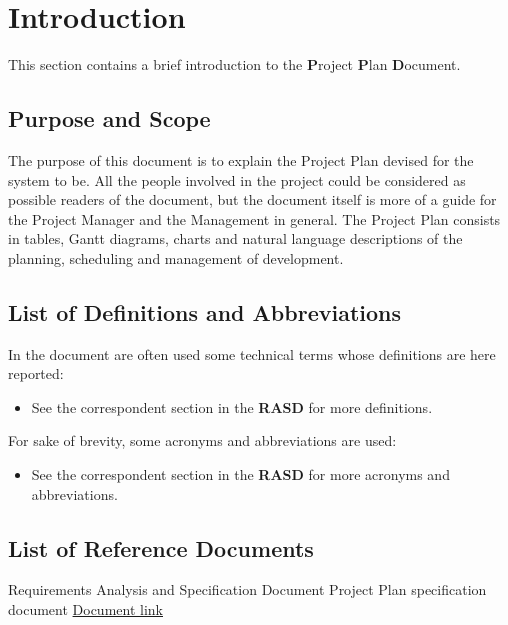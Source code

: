 \section{Introduction}
This section contains a brief introduction to the \textbf{P}roject \textbf{P}lan \textbf{D}ocument.
%
\subsection{Purpose and Scope}
The purpose of this document is to explain the Project Plan devised for the system to be.
All the people involved in the project could be considered as possible readers of the document, but the document itself is more of a guide for the Project Manager and the Management in general.
The Project Plan consists in tables, Gantt diagrams, charts and natural language descriptions of the planning, scheduling and management of \myTaxiService{} development.
%
\subsection{List of Definitions and Abbreviations}
In the document are often used some technical terms whose definitions are here reported:
\begin{itemize}
	\item See the correspondent section in the \textbf{RASD} for more definitions.
\end{itemize}
For sake of brevity, some acronyms and abbreviations are used:
\begin{itemize}
	 Project Plan Document.
	 Function Points.
	 Internal Logic File.
	 External Logic File.
	 External Input.
	 External Output.
	 External Inquiry.
	 Constructive Cost Model.
	\item See the correspondent section in the \textbf{RASD} for more acronyms and abbreviations.
\end{itemize}
%
\subsection{List of Reference Documents}
\begin{itemize}
	 Requirements Analysis and Specification Document
	 Project Plan specification document
	 \href{http://csse.usc.edu/csse/research/COCOMOII/cocomo2000.0/CII_modelman2000.0.pdf}{Document link}
\end{itemize}
%